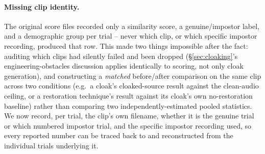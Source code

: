 \documentclass[11pt]{article}
\begin{document}
\paragraph{Missing clip identity.} The original score files recorded
only a similarity score, a genuine/impostor label, and a demographic
group per trial -- never which clip, or which specific impostor
recording, produced that row. This made two things impossible after
the fact: auditing which clips had silently failed and been dropped
(\S\ref{sec:cloaking}'s engineering-obstacles discussion applies
identically to scoring, not only cloak generation), and constructing a
\emph{matched} before/after comparison on the same clip across two
conditions (e.g.\ a cloak's cloaked-source result against the
clean-audio ceiling, or a restoration technique's result against its
cloak's own no-restoration baseline) rather than comparing two
independently-estimated pooled statistics. We now record, per trial,
the clip's own filename, whether it is the genuine trial or which
numbered impostor trial, and the specific impostor recording used, so
every reported number can be traced back to and reconstructed from the
individual trials underlying it.
\end{document}
